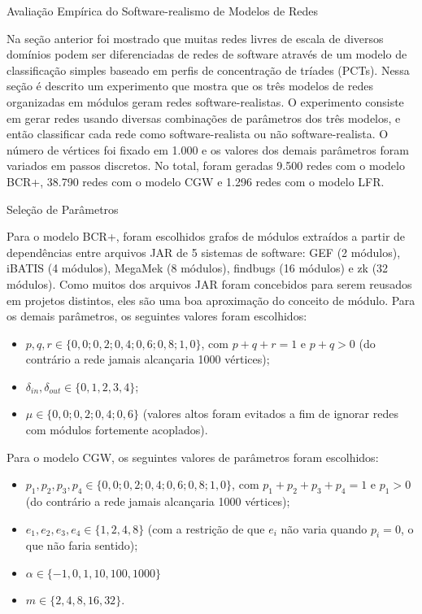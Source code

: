 \begin{section}{Avaliação Empírica do Software-realismo de Modelos de Redes}

Na seção anterior foi mostrado que muitas redes livres de escala de diversos domínios podem ser diferenciadas de redes de software através de um modelo de classificação simples baseado em perfis de concentração de tríades (PCTs). Nessa seção é descrito um experimento que mostra que os três modelos de redes organizadas em módulos geram redes software-realistas. O experimento consiste em gerar redes usando diversas combinações de parâmetros dos três modelos, e então classificar cada rede como software-realista ou não software-realista. O número de vértices foi fixado em 1.000 e os valores dos demais parâmetros foram variados em passos discretos. No total, foram geradas 9.500 redes com o modelo BCR+, 38.790 redes com o modelo CGW e 1.296 redes com o modelo LFR.

\begin{subsection}{Seleção de Parâmetros}

Para o modelo BCR+, foram escolhidos grafos de módulos extraídos a partir de dependências entre arquivos JAR de 5 sistemas de software: GEF (2 módulos), iBATIS (4 módulos), MegaMek (8 módulos), findbugs (16 módulos) e zk (32 módulos). Como muitos dos arquivos JAR foram concebidos para serem reusados em projetos distintos, eles são uma boa aproximação do conceito de módulo. Para os demais parâmetros, os seguintes valores foram escolhidos:

\begin{itemize}
	\item $p, q, r \in \{0,0; 0,2; 0,4; 0,6; 0,8; 1,0\}$, com $p + q + r = 1$ e $p + q > 0$ (do contrário a rede jamais alcançaria 1000 vértices);
	\item $\delta_{in}, \delta_{out} \in \{0, 1, 2, 3, 4\}$;
	\item $\mu \in \{0,0; 0,2; 0,4; 0,6\}$ (valores altos foram evitados a fim de ignorar redes com módulos fortemente acoplados).
\end{itemize}

Para o modelo CGW, os seguintes valores de parâmetros foram escolhidos:

\begin{itemize}
	\item $p_1, p_2, p_3, p_4 \in \{0,0; 0,2; 0,4; 0,6; 0,8; 1,0\}$, com $p_1 + p_2 + p_3 + p_4 = 1$ e $p_1 > 0$ (do contrário a rede jamais alcançaria 1000 vértices);
	\item $e_1, e_2, e_3, e_4 \in \{1, 2, 4, 8\}$ (com a restrição de que $e_i$ não varia quando $p_i = 0$, o que não faria sentido);
	\item $\alpha \in \{-1, 0, 1, 10, 100, 1000\}$
	\item $m \in \{2, 4, 8, 16, 32\}$.
\end{itemize}


\end{subsection}
\end{section}

